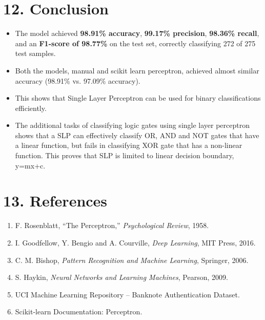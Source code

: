 \documentclass[11pt]{article}
\begin{document}
\section*{12. Conclusion}
\begin{itemize}[leftmargin=*]
\item The model achieved \textbf{98.91\% accuracy}, \textbf{99.17\% precision}, \textbf{98.36\% recall}, and an \textbf{F1-score of 98.77\%} on the test set, correctly classifying 272 of 275 test samples.\\
\item Both the models, manual and scikit learn perceptron,  achieved almost similar accuracy (98.91\% vs. 97.09\% accuracy).\\
\item This shows that Single Layer Perceptron can be used for binary classifications efficiently.\\
\item The additional tasks of classifying logic gates using single layer perceptron shows that a SLP can effectively classify OR, AND and NOT gates that have a linear function, but fails in classifying XOR gate that has a non-linear function. This proves that SLP is limited to linear decision boundary, y=mx+c.\\
\end{itemize}

\section*{13. References}
\begin{enumerate}
\item F. Rosenblatt, ``The Perceptron,'' \emph{Psychological Review}, 1958.
\item I. Goodfellow, Y. Bengio and A. Courville, \emph{Deep Learning}, MIT Press, 2016.
\item C. M. Bishop, \emph{Pattern Recognition and Machine Learning}, Springer, 2006.
\item S. Haykin, \emph{Neural Networks and Learning Machines}, Pearson, 2009.
\item UCI Machine Learning Repository -- Banknote Authentication Dataset.
\item Scikit-learn Documentation: Perceptron.
\end{enumerate}
\end{document}
